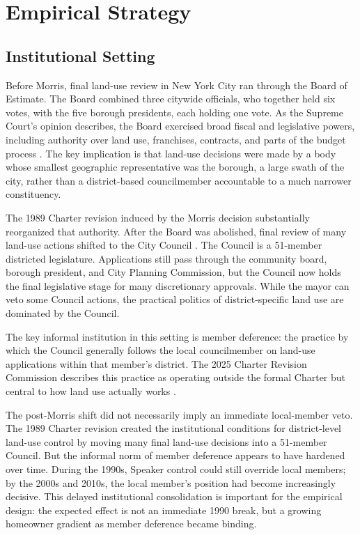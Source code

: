\section{Empirical Strategy}
\label{sec:empirical_strategy}

\subsection{Institutional Setting}

Before Morris, final land-use review in New York City ran through the Board of Estimate.
The Board combined three citywide officials, who together held six votes, with the five borough presidents, each holding one vote.
As the Supreme Court's opinion describes, the Board exercised broad fiscal and legislative powers, including authority over land use, franchises, contracts, and parts of the budget process \citep{board_of_estimate_of_city_of_new_york_v_morris_notitle_1989}.
The key implication is that land-use decisions were made by a body whose smallest geographic representative was the borough, a large swath of the city, rather than a district-based councilmember accountable to a much narrower constituency.

The 1989 Charter revision induced by the Morris decision substantially reorganized that authority. After the Board was abolished, final review of many land-use actions shifted to the City Council \citep{lane_policy_1998}.
The Council is a 51-member districted legislature.
Applications still pass through the community board, borough president, and City Planning Commission, but the Council now holds the final legislative stage for many discretionary approvals.
While the mayor can veto some Council actions, the practical politics of district-specific land use are dominated by the Council.

The key informal institution in this setting is member deference: the practice by which the Council generally follows the local councilmember on land-use applications within that member's district.
The 2025 Charter Revision Commission describes this practice as operating outside the formal Charter but central to how land use actually works \citep{new_york_city_charter_revision_commission_charter_2025}.

The post-Morris shift did not necessarily imply an immediate local-member veto. 
The 1989 Charter revision created the institutional conditions for district-level land-use control by moving many final land-use decisions into a 51-member Council. But the informal norm of member deference appears to have hardened over time. 
During the 1990s, Speaker control could still override local members; by the 2000s and 2010s, the local member’s position had become increasingly decisive. This delayed institutional consolidation is important for the empirical design: the expected effect is not an immediate 1990 break, but a growing homeowner gradient as member deference became binding.

